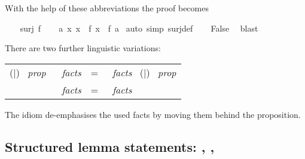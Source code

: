 \begin{isabellebody}
\begin{isamarkuptext}
\noindent
With the help of these abbreviations the proof becomes%
\end{isamarkuptext}%
\isamarkuptrue%
%
\isadelimproof
%
\endisadelimproof
%
\isatagproof
{}\isamarkupfalse%
\isanewline
\ \ \isamarkupfalse%
\ {}surj\ f{}\isanewline
\ \ \isamarkupfalse%
\ {}{}a{}\ {}x{}\ x\ {}\ f\ x{}\ {}\ f\ a{}\ \isamarkupfalse%
{}auto\ simp{}\ surj{}def{}\isanewline
\ \ \isamarkupfalse%
\ {}False{}\ \isamarkupfalse%
\ blast\isanewline
{}\isamarkupfalse%
%
\endisatagproof
{\isafoldproof}%
%
\isadelimproof
%
\endisadelimproof
%
\begin{isamarkuptext}%
There are two further linguistic variations:
\medskip

\begin{tabular}{rcl}
(\isacom{have}$\mid$\isacom{show}) \ \textit{prop} \ \isacom{using} \ \textit{facts}
&=&
\isacom{from} \ \textit{facts} \ (\isacom{have}$\mid$\isacom{show}) \ \textit{prop}\\
\isacom{with} \ \textit{facts} &=& \isacom{from} \ \textit{facts} \isa{this}
\end{tabular}
\medskip

\noindent The  idiom de-emphasises the used facts by moving them
behind the proposition.

\subsection{Structured lemma statements: , , }


\end{isamarkuptext}
\end{isabellebody}
